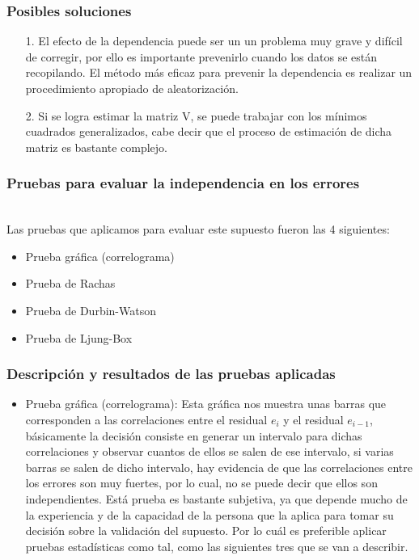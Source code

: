 \documentclass[12pt]{beamer}
\begin{document}
\begin{frame}
\frametitle{Posibles soluciones}
\begin{itemize}
\item[1.]El efecto de la dependencia puede ser un un problema muy grave y difícil de corregir, por ello es importante prevenirlo cuando los datos se están recopilando. El método más eficaz para prevenir la dependencia es realizar un procedimiento apropiado de aleatorización.
\item[2.]Si se logra estimar la matriz V, se puede trabajar con los mínimos cuadrados generalizados, cabe decir que el proceso de estimación de dicha matriz es bastante complejo.
\end{itemize}
\end{frame}

\begin{frame}
\frametitle{Pruebas para evaluar la independencia en los errores}
~\\ Las pruebas que aplicamos para evaluar este supuesto fueron las 4 siguientes:
\begin{itemize}
\item Prueba gráfica (correlograma)
\item Prueba de Rachas
\item Prueba de Durbin-Watson
\item Prueba de Ljung-Box
\end{itemize}
\end{frame}

\begin{frame}
\frametitle{Descripción y resultados de las pruebas aplicadas}
\begin{itemize}
\item Prueba gráfica (correlograma): Esta gráfica nos muestra unas barras que corresponden a las correlaciones entre el residual $e_{i}$ y el residual $e_{i-1}$, básicamente la decisión consiste en generar un intervalo para dichas correlaciones y observar cuantos de ellos se salen de ese intervalo, si varias barras se salen de dicho intervalo, hay evidencia de que las correlaciones entre los errores son muy fuertes, por lo cual, no se puede decir que ellos son independientes. Está prueba es bastante subjetiva, ya que depende mucho de la experiencia y de la capacidad de la persona que la aplica para tomar su decisión sobre la validación del supuesto. Por lo cuál es preferible aplicar pruebas estadísticas como tal, como las siguientes tres que se van a describir.
\end{itemize}
\end{frame}
\end{document}
